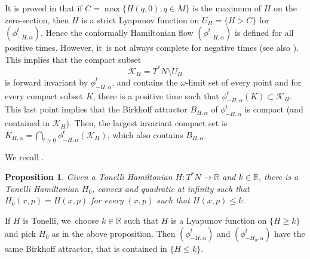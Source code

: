 \documentclass[10pt]{amsart}
\newtheorem{prop}[thm]{Proposition}
\theoremstyle{definition}
\newcommand{\R}{\mathbb{R}}
\begin{document}
It is proved in \cite{ArnaudSuZavidovique} that if $C=\max\{H(q, 0); q\in M\}$ is the maximum of $H$ on the zero-section, then $H$ is a strict Lyapunov function on $U_H=\{ H>C\}$ for $(\phi_{-H, \alpha}^t)$. Hence the conformally Hamiltonian flow $(\phi^t_{-H, \alpha})$ is defined for all positive times. However, it~is not always complete for negative times (see also \cite{MaroSor2017}).
This implies that the compact subset\vspace*{-3pt}\enlargethispage{.5\baselineskip}
\begin{equation}\label{EKH}
\mathcal K_H=T^*N\setminus U_H
\end{equation}
is forward invariant by $\phi_{-H,\alpha}^t$, and contains the $\omega$-limit set of every point and for every compact subset $K$, there is a positive time such that $\phi^t_{-H, \alpha}(K)\subset \mathcal K_H$. This last point implies that the Birkhoff attractor $B_{H, \alpha}$ of $\phi_{-H,\alpha}^t$ is compact (and contained in $\mathcal K_H$). Then, the largest invariant compact set is $K_{H,\alpha}=\bigcap_{t>0}\phi^t_{-H, \alpha}(\mathcal K_H)$, which also contains $B_{H, \alpha}$.

We recall \cite[Prop.\,18]{CIPP}.

\begin{prop} Given a Tonelli Hamiltonian $H:T^*N\to\R$ and $k\in\R$, there is a Tonelli Hamiltonian $H_0$, convex and quadratic at infinity such that $H_0(x,p) = H(x, p)$ for every $(x, p)$ such that $H(x, p) \leq k$.
\end{prop}

If $H$ is Tonelli, we~choose $k\in \R$ such that $H$ is a Lyapunov function on $\{ H\geq k\}$ and pick $H_0$ as in the above proposition. Then $(\phi^t_{-H, \alpha})$ and $(\phi^t_{-H_0, \alpha})$ have the same Birkhoff attractor, that is contained in $\{ H\leq k\}$.
\end{document}
